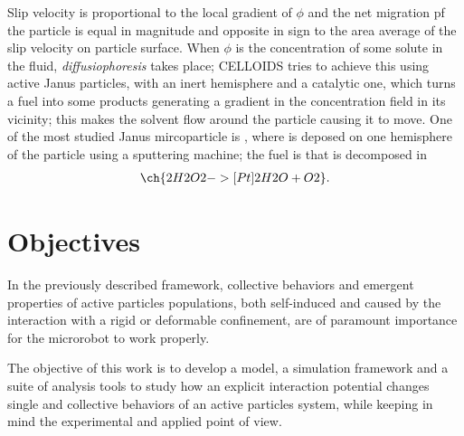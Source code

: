 \documentclass[../../master_thesis_np.tex]{subfiles}
\begin{document}
	Slip velocity is proportional to the local gradient of $\phi$ and the net migration pf the particle is equal in magnitude and opposite in sign to the area average of the slip velocity on particle surface.
	When $\phi$ is the concentration of some solute in the fluid, \emph{diffusiophoresis} takes place; CELLOIDS tries to achieve this using active Janus particles, with an inert hemisphere and a catalytic one, which turns a fuel into some products generating a gradient in the concentration field in its vicinity; this makes the solvent flow around the particle causing it to move. 
	One of the most studied Janus mircoparticle is , where  is deposed on one hemisphere of the particle using a sputtering machine; the fuel is  that is decomposed in 
	\begin{align}
	\ch{2 H2O2 ->[Pt] 2 H2O + O2}.
	\end{align}
	
	\section{Objectives}	
	In the previously described framework, collective behaviors and emergent properties of active particles populations, both self-induced and caused by the interaction with a rigid or deformable confinement, are of paramount importance for the microrobot to work properly. 
	
	The objective of this work is to develop a model, a simulation framework and a suite of analysis tools to study how an explicit interaction potential changes single and collective behaviors of an active particles system, while keeping in mind the experimental and applied point of view. 
	
\end{document}
